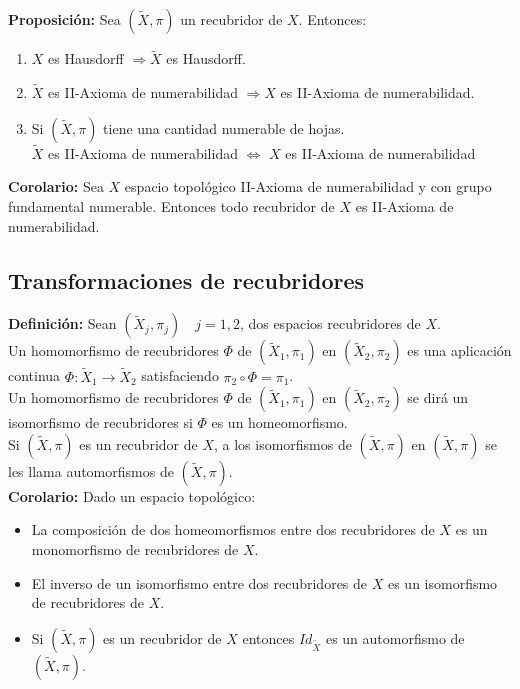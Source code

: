\documentclass{article}
\begin{document}
\textbf{Proposición:} Sea $(\tilde{X},\pi)$ un recubridor de $X$. Entonces:
\begin{enumerate}
\item $X$ es Hausdorff $\Rightarrow \tilde{X}$ es Hausdorff.

\item $\tilde{X}$ es II-Axioma de numerabilidad $\Rightarrow X$ es II-Axioma de numerabilidad.

\item Si $(\tilde{X},\pi)$ tiene una cantidad numerable de hojas.\\

\centering
$\tilde{X}$ es II-Axioma de numerabilidad $\Leftrightarrow$ $X$ es II-Axioma de numerabilidad
\end{enumerate}

\textbf{Corolario:} Sea $X$ espacio topológico II-Axioma de numerabilidad y con grupo fundamental numerable. Entonces todo recubridor de $X$ es II-Axioma de numerabilidad.

\subsection{Transformaciones de recubridores}
\textbf{Definición:} Sean $(\tilde{X}_j,\pi_j)\quad j=1,2$, dos espacios recubridores de $X$. \\

Un homomorfismo de recubridores $\Phi$ de $(\tilde{X}_1,\pi_1)$ en $(\tilde{X}_2,\pi_2)$ es una aplicación continua $\Phi:\tilde{X}_1\rightarrow \tilde{X}_2$ satisfaciendo $\pi_2\circ \Phi=\pi_1$.\\

Un homomorfismo de recubridores $\Phi$ de $(\tilde{X}_1,\pi_1)$ en $(\tilde{X}_2,\pi_2)$ se dirá un isomorfismo de recubridores si $\Phi$ es un homeomorfismo.\\

Si $(\tilde{X},\pi)$ es un recubridor de $X$, a los isomorfismos de $(\tilde{X},\pi)$ en $(\tilde{X},\pi)$ se les llama automorfismos de $(\tilde{X},\pi)$.\\

\textbf{Corolario:} Dado un espacio topológico:
\begin{itemize}
\item La composición de dos homeomorfismos entre dos recubridores de $X$ es un monomorfismo de recubridores de $X$.

\item El inverso de un isomorfismo entre dos recubridores de $X$ es un isomorfismo de recubridores de $X$.

\item Si $(\tilde{X},\pi)$ es un recubridor de $X$ entonces $Id_{\tilde{X}}$ es un automorfismo de $(\tilde{X},\pi)$.
\end{itemize}
\end{document}
